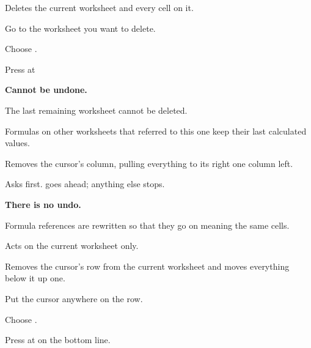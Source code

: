 
Deletes the current worksheet and every cell on it.

\begin{ccprocedure}[]
\item Go to the worksheet you want to delete.
\item Choose .
\item Press  at 
\end{ccprocedure}

\begin{ccsteps}
\item \textbf{Cannot be undone.}
\item The last remaining worksheet cannot be deleted.
\item Formulas on other worksheets that referred to this one keep their last
calculated values.
\end{ccsteps}


Removes the cursor's column, pulling everything to its right one column left.

\begin{ccsteps}
\item Asks  first.  goes ahead; anything else
stops.
\item \textbf{There is no undo.}
\item Formula references are rewritten so that they go on meaning the same
cells.
\item Acts on the current worksheet only.
\end{ccsteps}


Removes the cursor's row from the current worksheet and moves everything below
it up one.

\begin{ccprocedure}[]
\item Put the cursor anywhere on the row.
\item Choose .
\item Press  at  on the bottom line.
\end{ccprocedure}

